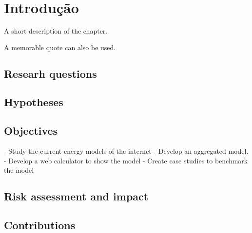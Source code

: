 

\chapter{Introdução}
\label{chapter:introduction}

\begin{introduction}
A short description of the chapter.

A memorable quote can also be used.
\end{introduction}

\section{Researh questions}

\section{Hypotheses}

\section{Objectives}

- Study the current energy models of the internet
- Develop an aggregated model.
- Develop a web calculator to show the model
- Create case studies to benchmark the model


\section{Risk assessment and impact}

\section{Contributions}